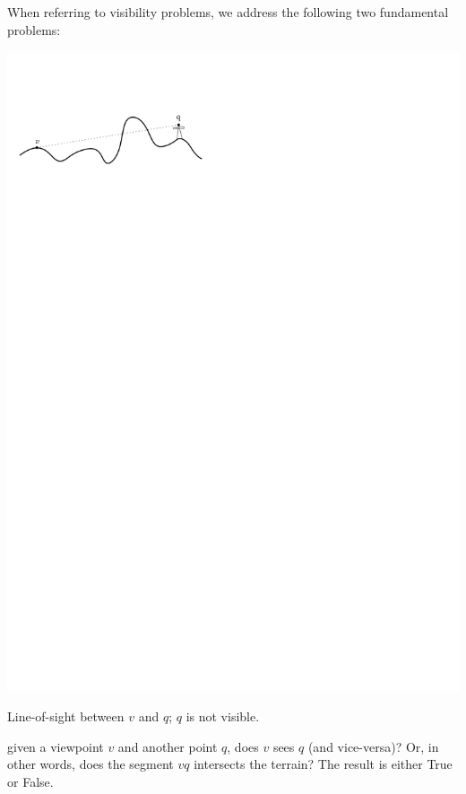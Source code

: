 When referring to visibility problems, we address the following two fundamental problems:
\begin{description}
  \begin{marginfigure}
    \centering
    \includegraphics[width=\linewidth]{figs/overview_los}
    \caption{Line-of-sight between $v$ and $q$; $q$ is not visible.}%
  \end{marginfigure} 
  \item[line-of-sight (LoS):] given a viewpoint $v$ and another point $q$, does $v$ sees $q$ (and vice-versa)? Or, in other words, does the segment $vq$ intersects the terrain? The result is either True or False.
  \begin{marginfigure}
    \centering

\end{marginfigure}
\end{description}
